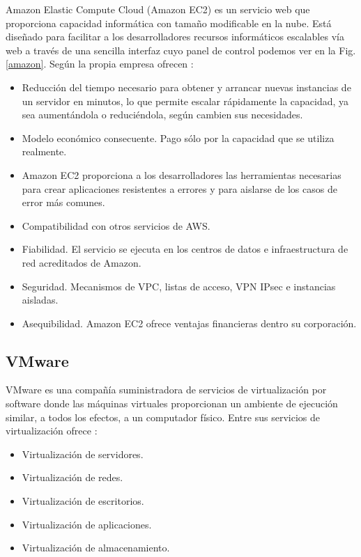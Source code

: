 Amazon Elastic Compute Cloud (Amazon EC2) es un servicio web que proporciona capacidad informática con tamaño modificable en la nube. Está diseñado para facilitar a los desarrolladores recursos informáticos escalables vía web a través de una sencilla interfaz cuyo panel de control podemos ver en la Fig.\ref{amazon}. Según la propia empresa ofrecen \cite{noauthor_aws_nodate}:

\begin{itemize}
\item Reducción del tiempo necesario para obtener y arrancar nuevas instancias de un servidor en minutos, lo que permite escalar rápidamente la capacidad, ya sea aumentándola o reduciéndola, según cambien sus necesidades.
\item Modelo económico consecuente. Pago sólo por la capacidad que se utiliza realmente.
\item Amazon EC2 proporciona a los desarrolladores las herramientas necesarias para crear aplicaciones resistentes a errores y para aislarse de los casos de error más comunes.
\item Compatibilidad con otros servicios de AWS.
\item Fiabilidad. El servicio se ejecuta en los centros de datos e infraestructura de red acreditados de Amazon.
\item Seguridad. Mecanismos de VPC, listas de acceso, VPN IPsec e instancias aisladas.
\item Asequibilidad. Amazon EC2 ofrece ventajas financieras dentro su corporación.
\end{itemize}

\subsection{VMware}
VMware es una compañía suministradora de servicios de virtualización por software donde las máquinas virtuales proporcionan un ambiente de ejecución similar, a todos los efectos, a un computador físico. Entre sus servicios de virtualización ofrece \cite{noauthor_virtualizacion_nodate}:

\begin{itemize}
\item Virtualización de servidores.
\item Virtualización de redes.
\item Virtualización de escritorios.
\item Virtualización de aplicaciones.
\item Virtualización de almacenamiento.
\end{itemize}

